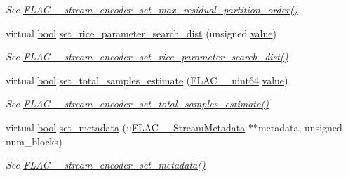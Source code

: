 \begin{DoxyCompactItemize}
\begin{DoxyCompactList}\small\item\em See \hyperlink{group__flac__stream__encoder_ga6de153da5a8eeeb1be2271c27fa58b37}{F\+L\+A\+C\+\_\+\+\_\+stream\+\_\+encoder\+\_\+set\+\_\+max\+\_\+residual\+\_\+partition\+\_\+order()} \end{DoxyCompactList}\item 
virtual \hyperlink{mac_2config_2i386_2lib-src_2libsoxr_2soxr-config_8h_abb452686968e48b67397da5f97445f5b}{bool} \hyperlink{class_f_l_a_c_1_1_encoder_1_1_stream_a0239613526c2ddee3f6a8c1ebc0eceb0}{set\+\_\+rice\+\_\+parameter\+\_\+search\+\_\+dist} (unsigned \hyperlink{lib_2expat_8h_a4a30a13b813682e68c5b689b45c65971}{value})
\begin{DoxyCompactList}\small\item\em See \hyperlink{group__flac__stream__encoder_ga668de93e7061bce21475c062ffab3e18}{F\+L\+A\+C\+\_\+\+\_\+stream\+\_\+encoder\+\_\+set\+\_\+rice\+\_\+parameter\+\_\+search\+\_\+dist()} \end{DoxyCompactList}\item 
virtual \hyperlink{mac_2config_2i386_2lib-src_2libsoxr_2soxr-config_8h_abb452686968e48b67397da5f97445f5b}{bool} \hyperlink{class_f_l_a_c_1_1_encoder_1_1_stream_a6a9dfe3cb7943751888b486853577237}{set\+\_\+total\+\_\+samples\+\_\+estimate} (\hyperlink{ordinals_8h_aa78c8c70a3eb8a58af7436f278acde8e}{F\+L\+A\+C\+\_\+\+\_\+uint64} \hyperlink{lib_2expat_8h_a4a30a13b813682e68c5b689b45c65971}{value})
\begin{DoxyCompactList}\small\item\em See \hyperlink{group__flac__stream__encoder_ga0d3f45052f2f7379c73e2b027c7f956c}{F\+L\+A\+C\+\_\+\+\_\+stream\+\_\+encoder\+\_\+set\+\_\+total\+\_\+samples\+\_\+estimate()} \end{DoxyCompactList}\item 
virtual \hyperlink{mac_2config_2i386_2lib-src_2libsoxr_2soxr-config_8h_abb452686968e48b67397da5f97445f5b}{bool} \hyperlink{class_f_l_a_c_1_1_encoder_1_1_stream_ade255a7fd915ebe4d4b3a1623beeb0a9}{set\+\_\+metadata} (\+::\hyperlink{struct_f_l_a_c_____stream_metadata}{F\+L\+A\+C\+\_\+\+\_\+\+Stream\+Metadata} $\ast$$\ast$metadata, unsigned num\+\_\+blocks)
\begin{DoxyCompactList}\small\item\em See \hyperlink{group__flac__stream__encoder_ga67b30b1a67a9274f7708a22154b225f6}{F\+L\+A\+C\+\_\+\+\_\+stream\+\_\+encoder\+\_\+set\+\_\+metadata()} \end{DoxyCompactList}\item 
$$
\end{DoxyCompactItemize}
